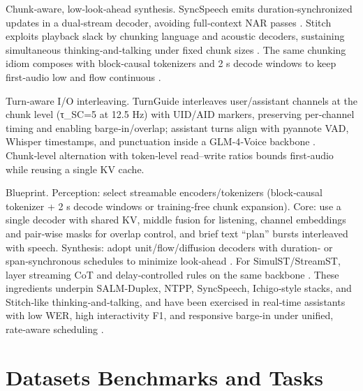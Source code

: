 Chunk‑aware, low‑look‑ahead synthesis. SyncSpeech emits duration‑synchronized updates in a dual‑stream decoder, avoiding full‑context NAR passes \cite{sheng2025syncspeechlowlatencyefficientdualstreamt}. Stitch exploits playback slack by chunking language and acoustic decoders, sustaining simultaneous thinking‑and‑talking under fixed chunk sizes \cite{chiang2025stitchsimultaneousthinkingtalkingchunked}. The same chunking idiom composes with block‑causal tokenizers and 2 s decode windows to keep first‑audio low and flow continuous \cite{zeng2024scalingspeechtextpretrainingsyntheticint}.

Turn‑aware I/O interleaving. TurnGuide interleaves user/assistant channels at the chunk level (τ_SC=5 at 12.5 Hz) with UID/AID markers, preserving per‑channel timing and enabling barge‑in/overlap; assistant turns align with pyannote VAD, Whisper timestamps, and punctuation inside a GLM‑4‑Voice backbone \cite{cui2025thinkbeforeyoutalkenhancingmeaningfuldia}. Chunk‑level alternation with token‑level read–write ratios bounds first‑audio while reusing a single KV cache.

Blueprint. Perception: select streamable encoders/tokenizers (block‑causal tokenizer + 2 s decode windows or training‑free chunk expansion). Core: use a single decoder with shared KV, middle fusion for listening, channel embeddings and pair‑wise masks for overlap control, and brief text “plan” bursts interleaved with speech. Synthesis: adopt unit/flow/diffusion decoders with duration‑ or span‑synchronous schedules to minimize look‑ahead \cite{sheng2025syncspeechlowlatencyefficientdualstreamt}. For SimulST/StreamST, layer streaming CoT and delay‑controlled rules on the same backbone \cite{guo2025streamuniachievingstreamingspeechtransla}. These ingredients underpin SALM‑Duplex, NTPP, SyncSpeech, Ichigo‑style stacks, and Stitch‑like thinking‑and‑talking, and have been exercised in real‑time assistants with low WER, high interactivity F1, and responsive barge‑in under unified, rate‑aware scheduling \cite{ma2024languagemodelcanlistenwhilespeaking,hu2025salmduplexefficientdirectmodelingspeechl,wang2025ntppgenerativespeechlanguagemodelingdual,chiang2025stitchsimultaneousthinkingtalkingchunked,zeng2024scalingspeechtextpretrainingsyntheticint}.









\section{Datasets Benchmarks and Tasks} \label{sec:Datasets Benchmarks and Tasks}

